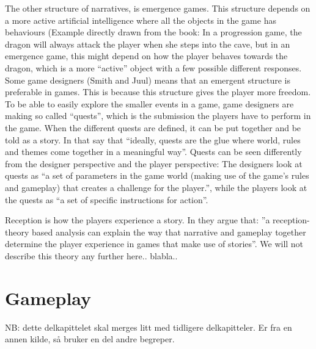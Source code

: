 The other structure of narratives, is emergence games. This structure depends on a more active artificial intelligence where all the objects in the game has behaviours (Example directly drawn from the book: In a progression game, the dragon will always attack the player when she steps into the cave, but in an emergence game, this might depend on how the player behaves towards the dragon, which is a more “active” object with a few possible different responses. Some game designers (Smith and Juul) means that an emergent structure is preferable in games. This is because this structure gives the player more freedom. To be able to easily explore the smaller events in a game, game designers are making so called “quests”, which is the submission the players have to perform in the game. When the different quests are defined, it can be put together and be told as a story. In \cite{understandingvg} that say that “ideally, quests are the glue where world, rules and themes come together in a meaningful way”. Quests can be seen differently from the designer perspective and the player perspective: The designers look at quests as “a set of parameters in the game world (making use of the game’s rules and gameplay) that creates a challenge for the player.”, while the players look at the quests as “a set of specific instructions for action”. 

Reception is how the players experience a story. In \cite{understandingvg} they argue that: ”a reception-theory based analysis can explain the way that narrative and gameplay together determine the player experience in games that make use of stories”. We will not describe this theory any further here.. blabla.. 

\section{Gameplay}
NB: dette delkapittelet skal merges litt med tidligere delkapitteler. Er fra en annen kilde, så bruker en del andre begreper.

